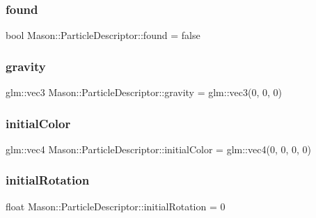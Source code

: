 \subsubsection{\texorpdfstring{found}{found}}
{\footnotesize\ttfamily bool Mason\+::\+Particle\+Descriptor\+::found = false}

\hypertarget{class_mason_1_1_particle_descriptor_abd5c0046bb19ee434c56f713c58103c3}{}\label{class_mason_1_1_particle_descriptor_abd5c0046bb19ee434c56f713c58103c3} 
\subsubsection{\texorpdfstring{gravity}{gravity}}
{\footnotesize\ttfamily glm\+::vec3 Mason\+::\+Particle\+Descriptor\+::gravity = glm\+::vec3(0, 0, 0)}

\hypertarget{class_mason_1_1_particle_descriptor_a458d7ca5c19a0bbcf1c73796dbaf3597}{}\label{class_mason_1_1_particle_descriptor_a458d7ca5c19a0bbcf1c73796dbaf3597} 
\subsubsection{\texorpdfstring{initial\+Color}{initialColor}}
{\footnotesize\ttfamily glm\+::vec4 Mason\+::\+Particle\+Descriptor\+::initial\+Color = glm\+::vec4(0, 0, 0, 0)}

\hypertarget{class_mason_1_1_particle_descriptor_a24f23bf106c1d0bf7dc676d16d64c6d7}{}\label{class_mason_1_1_particle_descriptor_a24f23bf106c1d0bf7dc676d16d64c6d7} 
\subsubsection{\texorpdfstring{initial\+Rotation}{initialRotation}}
{\footnotesize\ttfamily float Mason\+::\+Particle\+Descriptor\+::initial\+Rotation = 0}

\hypertarget{class_mason_1_1_particle_descriptor_aebf2ee5b2a1b72e03e010d66a1ccf054}{}\label{class_mason_1_1_particle_descriptor_aebf2ee5b2a1b72e03e010d66a1ccf054} 

